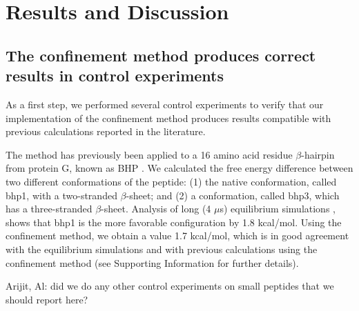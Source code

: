 \documentclass[12pt]{article}
\newcommand{\Justin}[1]{\color{blue}#1\normalcolor}
\begin{document}



\section{Results and Discussion}

\subsection{The confinement method produces correct results in control experiments}

As a first step, we performed several control experiments to verify that our implementation of the
confinement method produces results compatible with previous calculations reported in the
literature.

The method has previously been applied to a 16 amino acid residue $\beta$-hairpin from
protein G, known as BHP \cite{Cecchini2009}. We calculated the free energy difference between two different
conformations of the peptide: (1) the native conformation, called bhp1, with a two-stranded
$\beta$-sheet; and (2) a conformation, called bhp3, which has a three-stranded $\beta$-sheet.
Analysis of long (4 $\mu$s) equilibrium simulations \cite{Cecchini2009},\cite{Krivov2004}  shows that bhp1 is the more favorable
configuration by 1.8 kcal/mol. Using the confinement method, we obtain a value 1.7 kcal/mol, which
is in good agreement with the equilibrium simulations and with previous calculations using the
confinement method \cite{Cecchini2009} (see Supporting Information for further details).

\Justin{Arijit, Al: did we do any other control experiments on small peptides that we should report
here?}
\end{document}
